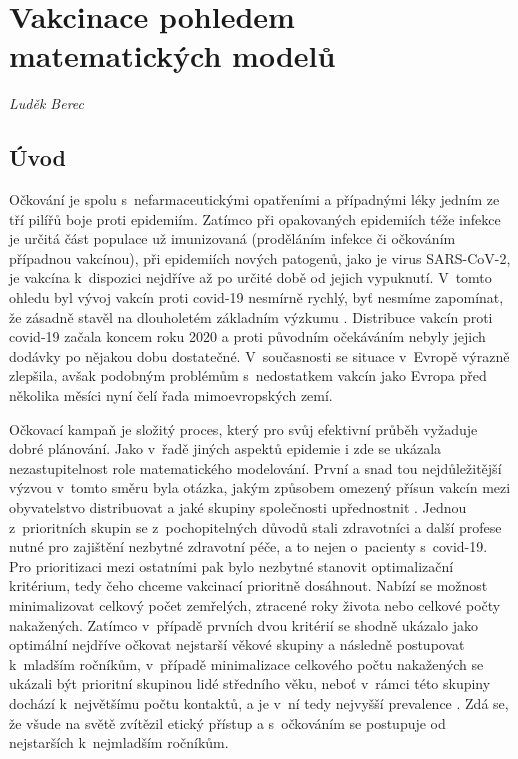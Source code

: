 \chapter{Vakcinace pohledem matematick\'{y}ch model\r{u}}
\label{Ucinnost_ockovani}

\textit{Luděk Berec}
\vspace{15mm}

\section*{Úvod}

Očkování je spolu s~nefarmaceutickými opatřeními a případnými léky jedním ze tří pilířů boje proti epidemiím. Zatímco při opakovaných epidemiích téže infekce je určitá část populace už imunizovaná (proděláním infekce či očkováním případnou vakcínou), při epidemiích nových patogenů, jako je virus SARS-CoV-2, je vakcína k~dispozici nejdříve až po určité době od jejich vypuknutí. V~tomto ohledu byl vývoj vakcín proti covid-19 nesmírně rychlý, byť nesmíme zapomínat, že zásadně stavěl na dlouholetém základním výzkumu \cite{Pardi_etal2018}. Distribuce vakcín proti covid-19 začala koncem roku 2020 a proti původním očekáváním nebyly jejich dodávky po nějakou dobu dostatečné. V~současnosti se situace v~Evropě výrazně zlepšila, avšak podobným problémům s~nedostatkem vakcín jako Evropa před několika měsíci nyní čelí řada mimoevropských zemí.

Očkovací kampaň je složitý proces, který pro svůj efektivní průběh vyžaduje dobré plánování. Jako v~řadě jiných aspektů epidemie i zde se ukázala nezastupitelnost role matematického modelování. První a snad tou nejdůležitější výzvou v~tomto směru byla otázka, jakým způsobem omezený přísun vakcín mezi obyvatelstvo distribuovat a jaké skupiny společnosti upřednostnit \cite{Bubar_etal2021,Moore_etal2021b}. Jednou z~prioritních skupin se z~pochopitelných důvodů stali zdravotníci a další profese nutné pro zajištění nezbytné zdravotní péče, a to nejen o~pacienty s~covid-19. Pro prioritizaci mezi ostatními pak bylo nezbytné stanovit optimalizační kritérium, tedy čeho chceme vakcinací prioritně dosáhnout. Nabízí se možnost minimalizovat celkový počet zemřelých, ztracené roky života nebo celkové počty nakažených. Zatímco v~případě prvních dvou kritérií se shodně ukázalo jako optimální nejdříve očkovat nejstarší věkové skupiny a následně postupovat k~mladším ročníkům, v~případě minimalizace celkového počtu nakažených se ukázali být prioritní skupinou lidé středního věku, neboť v~rámci této skupiny dochází k~největšímu počtu kontaktů, a je v~ní tedy nejvyšší prevalence \cite{Bubar_etal2021,Moore_etal2021b}. Zdá se, že všude na světě zvítězil etický přístup a s~očkováním se postupuje od nejstarších k~nejmladším ročníkům.


